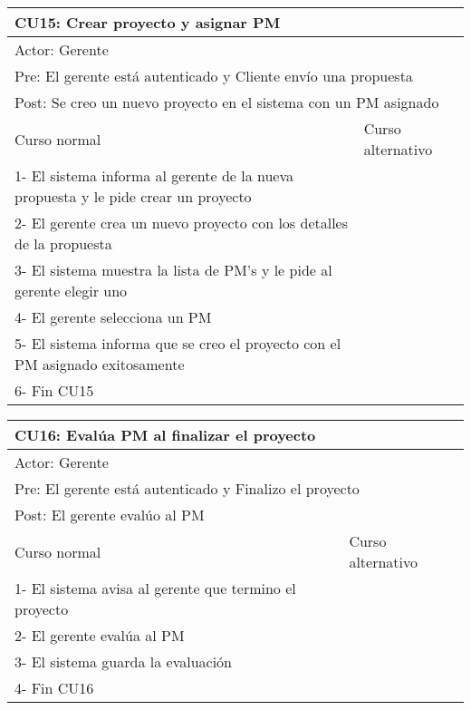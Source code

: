 \begin{table}[H]
  \begin{adjustbox}{max width = \textwidth}
  \begin{tabular}{|l|l|}
    \hline
    \multicolumn{2}{|l|}{CU15: Crear proyecto y asignar PM} \\\hline
    \multicolumn{2}{|l|}{Actor: Gerente} \\\hline
    \multicolumn{2}{|l|}{Pre: El gerente está autenticado y Cliente envío una propuesta} \\\hline
    \multicolumn{2}{|l|}{Post: Se creo un nuevo proyecto en el sistema con un PM asignado} \\\hline
     Curso normal & Curso alternativo\\ \hline
	 1- El sistema informa al gerente de la nueva propuesta y le pide crear un proyecto & \\ \hline
	 2- El gerente crea un nuevo proyecto con los detalles de la propuesta & \\ \hline
	 3- El sistema muestra la lista de PM's y le pide al gerente elegir uno & \\ \hline
     4- El gerente selecciona un PM & \\ \hline
	 5- El sistema informa que se creo el proyecto con el PM asignado exitosamente & \\ \hline
     6- Fin CU15 & \\ \hline
  \end{tabular}
  \end{adjustbox}
\end{table}

\begin{table}[H]
  \begin{adjustbox}{max width = \textwidth}
  \begin{tabular}{|l|l|}
    \hline
    \multicolumn{2}{|l|}{CU16: Evalúa PM al finalizar el proyecto} \\\hline
    \multicolumn{2}{|l|}{Actor: Gerente} \\\hline
    \multicolumn{2}{|l|}{Pre: El gerente está autenticado y Finalizo el proyecto} \\\hline
    \multicolumn{2}{|l|}{Post: El gerente evalúo al PM} \\\hline
     Curso normal & Curso alternativo\\ \hline
	 1- El sistema avisa al gerente que termino el proyecto & \\ \hline
	 2- El gerente evalúa al PM & \\ \hline
	 3- El sistema guarda la evaluación & \\ \hline
   4- Fin CU16 & \\ \hline
  \end{tabular}
  \end{adjustbox}
\end{table}

